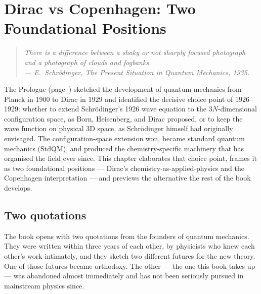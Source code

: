 \chapter{Dirac vs Copenhagen: Two Foundational Positions}\label{ch:dirac}


\begin{quote}
\itshape There is a difference between a shaky or not sharply focused photograph and a photograph of clouds and fogbanks.\\
\normalfont\hfill --- E.~Schr\"odinger, \emph{The Present Situation in Quantum Mechanics}, 1935.
\end{quote}
\bigskip

The Prologue (page~\pageref{ch:prologue}) sketched the development of quantum mechanics from Planck in 1900 to Dirac in 1929 and identified the decisive choice point of 1926--1929: whether to extend Schr\"odinger's 1926 wave equation to the $3N$-dimensional configuration space, as Born, Heisenberg, and Dirac proposed, or to keep the wave function on physical 3D space, as Schr\"odinger himself had originally envisaged. The configuration-space extension won, became standard quantum mechanics (StdQM), and produced the chemistry-specific machinery that has organised the field ever since. This chapter elaborates that choice point, frames it as two foundational positions --- Dirac's chemistry-as-applied-physics and the Copenhagen interpretation --- and previews the alternative the rest of the book develops.

\section{Two quotations}\label{sec:two-quotations}

The book opens with two quotations from the founders of quantum mechanics. They were written within three years of each other, by physicists who knew each other's work intimately, and they sketch two different futures for the new theory. One of those futures became orthodoxy. The other --- the one this book takes up --- was abandoned almost immediately and has not been seriously pursued in mainstream physics since.

